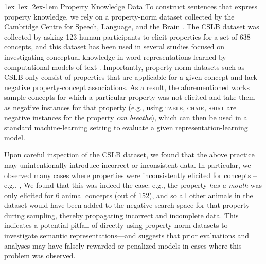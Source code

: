 \documentclass[10pt,letterpaper]{article}
\makeatletter
\renewcommand{\paragraph}{%
  \@startsection{paragraph}{4}%
  {\z@}{1ex \@plus 1ex \@minus .2ex}{-1em}%
  {\normalfont\normalsize\bfseries}%
}
\makeatother
\begin{document}
\paragraph{Property Knowledge Data} To construct sentences that express property knowledge, we rely on a property-norm dataset collected by the Cambridge Centre for Speech, Language, and the Brain \citep[CSLB;][]{devereux2014centre}.
The CSLB dataset was collected by asking 123 human participants to elicit properties for a set of 638 concepts, and this dataset has been used in several studies focused on investigating conceptual knowledge in word representations learned by computational models of text \citep[e.g., ][]{lucy-gauthier-2017-distributional, da-kasai-2019-cracking, bhatia2020transformer}.
Importantly, property-norm datasets such as CSLB only consist of properties that are applicable for a given concept and lack negative property-concept associations.
As a result, the aforementioned works \citep{lucy-gauthier-2017-distributional, da-kasai-2019-cracking, bhatia2020transformer} sample concepts for which a particular property was not elicited and take them as negative instances for that property (e.g., using \textsc{table, chair, shirt} are negative instances for the property \textit{can breathe}), which can then be used in a standard machine-learning setting to evaluate a given representation-learning model.

Upon careful inspection of the CSLB dataset, we found that the above practice may unintentionally introduce incorrect or inconsistent data.
In particular, we observed many cases where properties were inconsistently elicited for concepts -- e.g., , 
We found that this was indeed the case: e.g., the property \textit{has a mouth} was only elicited for 6 animal concepts (out of 152), and so all other animals in the dataset would have been added to the negative search space for that property during sampling, thereby propagating incorrect and incomplete data. This indicates a potential pitfall of directly using property-norm datasets to investigate semantic representations---and suggests that prior evaluations and analyses \citep{lucy-gauthier-2017-distributional, da-kasai-2019-cracking, bhatia2020transformer} may have falsely rewarded or penalized models in cases where this problem was observed.



\setlength{\bibleftmargin}{.125in}
\setlength{\bibindent}{-\bibleftmargin}


\end{document}
